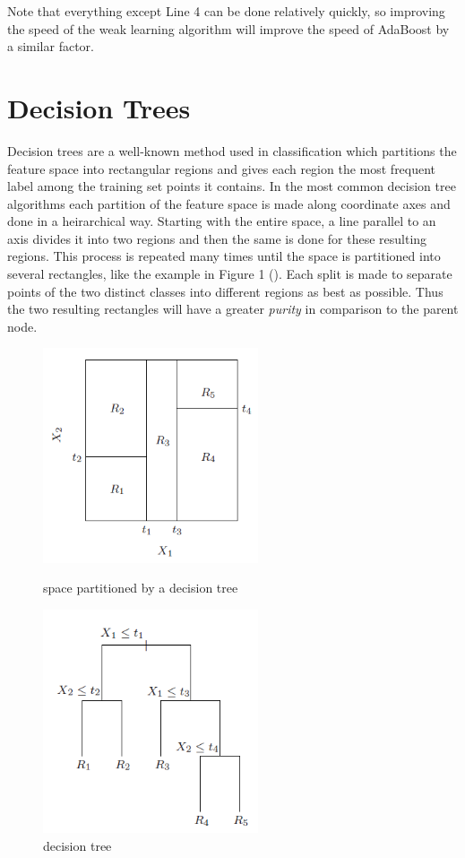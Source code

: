 \documentclass[12pt]{article}
\begin{document}
Note that everything except Line 4 can be done relatively quickly, so improving
the speed of the weak learning algorithm will improve the speed of AdaBoost by
a similar factor. 

\section{Decision Trees}
Decision trees are a well-known method used in classification which partitions
the feature space into rectangular regions and gives each region the most
frequent label among the training set points it contains. In the most common
decision tree algorithms each partition of the feature space is made along
coordinate axes and done in a heirarchical way.  Starting with the entire
space, a line parallel to an axis divides it into two regions and then the same
is done for these resulting regions. This process is repeated many times until
the space is partitioned into several rectangles, like the example in Figure 1
(\cite{HTF}). Each split is made to separate points of the two distinct classes
into different regions as best as possible. Thus the two resulting rectangles
will have a greater {\it purity} in comparison to the parent node.

\begin{figure}[b!]
\centering
\begin{minipage}{0.45\textwidth}
\centering
\includegraphics[width=2.5in]{partition}
\caption{space partitioned by a decision tree}
\end{minipage}\hfill
\begin{minipage}{0.45\textwidth}
\centering
\includegraphics[width=2.5in]{dectree}
\caption{decision tree}
\end{minipage}
\end{figure}
\end{document}
